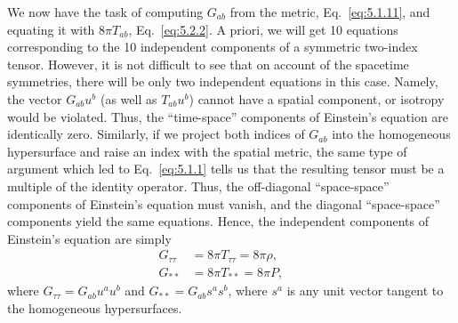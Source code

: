 We now have the task of computing \(G_{ab}\) from the metric,
Eq.~\eqref{eq:5.1.11}, and equating it with \(8\pi T_{ab}\), Eq.~\eqref{eq:5.2.2}. A
priori, we will get 10 equations corresponding to the 10 independent components of
a symmetric two-index tensor. However, it is not difficult to see that on account of
the spacetime symmetries, there will be only two independent equations in this case.
Namely, the vector \(G_{ab}u^b\) (as well as \(T_{ab}u^b\)) cannot have a spatial
component, or isotropy would be violated. Thus, the ``time-space'' components of
Einstein's equation are identically zero. Similarly, if we project both indices of
\(G_{ab}\) into the homogeneous hypersurface and raise an index with the spatial
metric, the same type of argument which led to Eq.~\eqref{eq:5.1.1} tells us that the
resulting tensor must be a multiple of the identity operator. Thus, the off-diagonal
``space-space'' components of Einstein's equation must vanish, and the diagonal
``space-space'' components yield the same equations. Hence, the independent
components of Einstein's equation are simply
\begin{align}
  G_{\tau\tau}&=8\pi T_{\tau\tau}=8\pi\rho, &&\tag{5.2.3}\label{eq:5.2.3}\\
  G_{**}&=8\pi T_{**}=8\pi P, &&\tag{5.2.4}\label{eq:5.2.4}
\end{align}
where \(G_{\tau\tau}=G_{ab}u^a u^b\) and \(G_{**}=G_{ab}s^a s^b\), where \(s^a\)
is any unit vector tangent to the homogeneous hypersurfaces.

